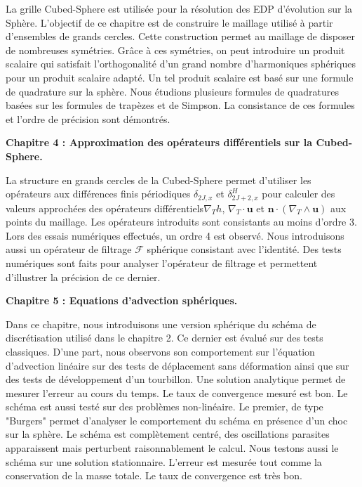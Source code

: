 La grille Cubed-Sphere est utilisée pour la résolution des EDP d'évolution sur la Sphère. L'objectif de ce chapitre est de construire le maillage utilisé à partir d'ensembles de grands cercles. Cette construction permet au maillage de disposer de nombreuses symétries. Grâce à ces symétries, on peut introduire un produit scalaire qui satisfait l'orthogonalité d'un grand nombre d'harmoniques sphériques pour un produit scalaire adapté. Un tel produit scalaire est basé sur une formule de quadrature sur la sphère. Nous étudions plusieurs formules de quadratures basées sur les formules de trapèzes et de Simpson. La consistance de ces formules et l'ordre de précision sont démontrés. 




\vspace{0.7cm}
\textbf{Chapitre 4 : Approximation des opérateurs différentiels sur la Cubed-Sphere.}

La structure en grands cercles de la Cubed-Sphere permet d'utiliser les opérateurs aux différences finis périodiques $\delta_{2J,x}$ et $\delta_{2J+2,x}^H$ pour calculer des valeurs approchées des opérateurs différentiels$\nabla_T h$, $\nabla_T \cdot \mathbf{u}$ et $\mathbf{n} \cdot (\nabla_T \wedge \mathbf{u})$ aux points du maillage. Les opérateurs introduits sont consistants au moins d'ordre 3. Lors des essais numériques effectués, un ordre 4 est observé. Nous introduisons aussi un opérateur de filtrage $\mathcal{F}$ sphérique consistant avec l'identité. Des tests numériques sont faits pour analyser l'opérateur de filtrage et permettent d'illustrer la précision de ce dernier.





\vspace{0.7cm}
\textbf{Chapitre 5 : Equations d'advection sphériques.}

Dans ce chapitre, nous introduisons une version sphérique du schéma de discrétisation utilisé dans le chapitre 2. Ce dernier est évalué sur des tests classiques. D'une part, nous observons son comportement sur l'équation d'advection linéaire sur des tests de déplacement sans déformation ainsi que sur des tests de développement d'un tourbillon. Une solution analytique permet de mesurer l'erreur au cours du temps. Le taux de convergence mesuré est bon. Le schéma est aussi testé sur des problèmes non-linéaire. Le premier, de type "Burgers" permet d'analyser le comportement du schéma en présence d'un choc sur la sphère. Le schéma est complètement centré, des oscillations parasites apparaissent mais perturbent raisonnablement le calcul. Nous testons aussi le schéma sur une solution stationnaire. L'erreur est mesurée tout comme la conservation de la masse totale. Le taux de convergence est très bon.




